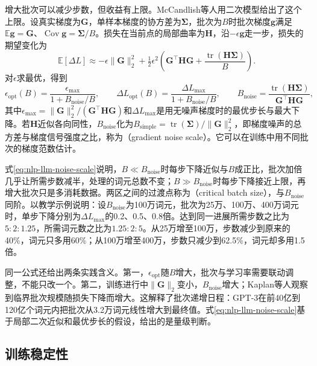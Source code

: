 增大批次可以减少步数，但收益有上限。McCandlish等人用二次模型给出了这个上限。设真实梯度为$\bm G$，单样本梯度的协方差为$\bm\Sigma$，批次为$B$时批次梯度$\bm g$满足$\mathbb E\bm g=\bm G$、$\operatorname{Cov}\bm g=\bm\Sigma/B$。损失在当前点的局部曲率为$\bm H$，沿$-\epsilon\bm g$走一步，损失的期望变化为
\begin{equation*}
 \mathbb E[\Delta L]\approx-\epsilon\lVert\bm G\rVert_2^2+\tfrac12\epsilon^2\left(\bm G^{\top}\bm H\bm G+\frac{\operatorname{tr}(\bm H\bm\Sigma)}{B}\right).
\end{equation*}
对$\epsilon$求最优，得到
\begin{equation}
 \epsilon_{\mathrm{opt}}(B)=\frac{\epsilon_{\max}}{1+B_{\mathrm{noise}}/B},\qquad
 \Delta L_{\mathrm{opt}}(B)=\frac{\Delta L_{\max}}{1+B_{\mathrm{noise}}/B},\qquad
 B_{\mathrm{noise}}=\frac{\operatorname{tr}(\bm H\bm\Sigma)}{\bm G^{\top}\bm H\bm G},
 \label{eq:nlp-llm-noise-scale}
\end{equation}
其中$\epsilon_{\max}=\lVert\bm G\rVert_2^2/(\bm G^{\top}\bm H\bm G)$和$\Delta L_{\max}$是用无噪声梯度时的最优步长与最大下降。若$\bm H$近似各向同性，$B_{\mathrm{noise}}$化为$B_{\mathrm{simple}}=\operatorname{tr}(\bm\Sigma)/\lVert\bm G\rVert_2^2$，即梯度噪声的总方差与梯度信号强度之比，称为（gradient noise scale）。它可以在训练中用不同批次的梯度范数估计。

式\eqref{eq:nlp-llm-noise-scale}说明，$B\ll B_{\mathrm{noise}}$时每步下降近似与$B$成正比，批次加倍几乎让所需步数减半，处理的词元总数不变；$B\gg B_{\mathrm{noise}}$时每步下降接近上限，再增大批次只是多消耗数据。两区之间的过渡点称为（critical batch size），与$B_{\mathrm{noise}}$同阶。以教学示例说明：设$B_{\mathrm{noise}}$为100万词元，批次为25万、100万、400万词元时，单步下降分别为$\Delta L_{\max}$的0.2、0.5、0.8倍。达到同一进展所需步数之比为$5:2:1.25$，所需词元数之比为$1.25:2:5$。从25万增至100万，步数减少到原来的40\%，词元只多用60\%；从100万增至400万，步数只减少到62.5\%，词元却多用1.5倍。

同一公式还给出两条实践含义。第一，$\epsilon_{\mathrm{opt}}$随$B$增大，批次与学习率需要联动调整，不能只改一个。第二，训练进行中$\lVert\bm G\rVert_2$变小，$B_{\mathrm{noise}}$增大；Kaplan等人观察到临界批次规模随损失下降而增大。这解释了批次递增日程：GPT-3在前40亿到120亿个词元内把批次从3.2万词元线性增大到最终值。式\eqref{eq:nlp-llm-noise-scale}基于局部二次近似和最优步长的假设，给出的是量级判断。

\subsection{训练稳定性}
\label{sec:nlp-llm-stability}

